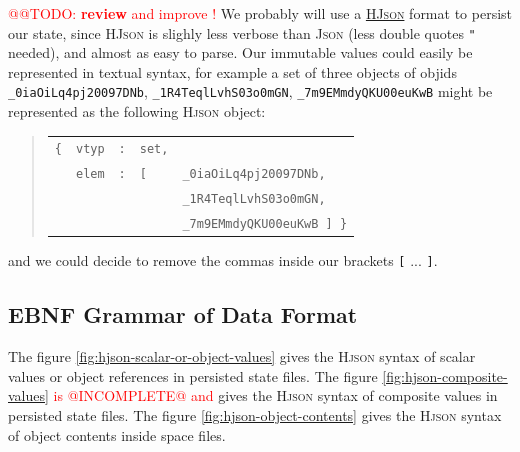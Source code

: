 \documentclass[11pt,a4paper,svgnames]{article}
\begin{document}
       
{\textcolor{red}{@@TODO: \textbf{review} and improve !}} We probably will use a \href{http://hjson.org}{\textsc{HJson}} format
to persist our state, since \textsc{HJson} is slighly less verbose
than \textsc{Json} (less double quotes \texttt{"} needed), and almost
as easy to parse. Our immutable values could easily be represented in
textual syntax, for example a set of three objects of objids
\texttt{\_0iaOiLq4pj20097DNb}, \texttt{\_1R4TeqlLvhS03o0mGN},
\texttt{\_7m9EMmdyQKU00euKwB} might be represented as the following
\textsc{Hjson} object:
\begin{quote}
\begin{relsize}{-1}
  \begin{tabular}{lllll}
    \texttt{\{} & \texttt{vtyp} & \texttt{:} & \texttt{set,} & ~  \\
    ~           & \texttt{elem} & \texttt{:} & \texttt{[} & \texttt{\_0iaOiLq4pj20097DNb,}  \\
    ~           & ~             & ~          & ~           & \texttt{\_1R4TeqlLvhS03o0mGN,} \\
    ~           & ~             & ~          & ~           & \texttt{\_7m9EMmdyQKU00euKwB ] \}} \\
  \end{tabular}
\end{relsize}
\end{quote}
and we could decide to remove the commas inside our brackets \texttt{[} {} ... \texttt{]}.
\medskip


\subsection{EBNF Grammar of Data Format}
\label{subsec:data-format-ebnf}


The figure \ref{fig:hjson-scalar-or-object-values} gives the
\textsc{Hjson} syntax of scalar values or object references in
persisted state files.  The figure \ref{fig:hjson-composite-values}
\textcolor{red}{is @INCOMPLETE@ and} gives the \textsc{Hjson} syntax
of composite values in persisted state files.  The figure
\ref{fig:hjson-object-contents} gives the \textsc{Hjson} syntax of
object contents inside space files.
\end{document}
